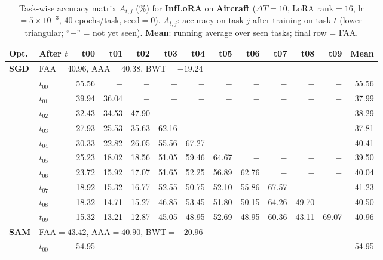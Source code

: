 \begin{table}[ht]
\centering
\caption{%
  Task-wise accuracy matrix $A_{t,j}$ (\%) for \textbf{InfLoRA} on \textbf{Aircraft} ($\Delta T=10$, LoRA rank$=16$, lr$=5\times10^{-3}$, 40 epochs/task, seed$=0$).
  $A_{t,j}$: accuracy on task $j$ after training on task $t$  (lower-triangular; ``$-$'' = not yet seen).
  \textbf{Mean}: running average over seen tasks; final row = FAA.
}
\label{tab:raw_inflora_aircraft}
\setlength{\tabcolsep}{2.8pt}
\renewcommand{\arraystretch}{0.88}
\scriptsize
\begin{tabular}{@{}l l r r r r r r r r r r r@{}}
\toprule
\textbf{Opt.} & \textbf{After $t$} & \textbf{t00} & \textbf{t01} & \textbf{t02} & \textbf{t03} & \textbf{t04} & \textbf{t05} & \textbf{t06} & \textbf{t07} & \textbf{t08} & \textbf{t09} & \textbf{Mean} \\
\midrule
\multirow{11}{*}{\textbf{SGD}} & \multicolumn{12}{l}{\quad\small FAA$=40.96$,\; AAA$=40.38$,\; BWT$=-19.24$} \\
 & $t_{00}$ & 55.56 & $-$ & $-$ & $-$ & $-$ & $-$ & $-$ & $-$ & $-$ & $-$ & 55.56 \\
 & $t_{01}$ & 39.94 & 36.04 & $-$ & $-$ & $-$ & $-$ & $-$ & $-$ & $-$ & $-$ & 37.99 \\
 & $t_{02}$ & 32.43 & 34.53 & 47.90 & $-$ & $-$ & $-$ & $-$ & $-$ & $-$ & $-$ & 38.29 \\
 & $t_{03}$ & 27.93 & 25.53 & 35.63 & 62.16 & $-$ & $-$ & $-$ & $-$ & $-$ & $-$ & 37.81 \\
 & $t_{04}$ & 30.33 & 22.82 & 26.05 & 55.56 & 67.27 & $-$ & $-$ & $-$ & $-$ & $-$ & 40.41 \\
 & $t_{05}$ & 25.23 & 18.02 & 18.56 & 51.05 & 59.46 & 64.67 & $-$ & $-$ & $-$ & $-$ & 39.50 \\
 & $t_{06}$ & 23.72 & 15.92 & 17.07 & 51.65 & 52.25 & 56.89 & 62.76 & $-$ & $-$ & $-$ & 40.04 \\
 & $t_{07}$ & 18.92 & 15.32 & 16.77 & 52.55 & 50.75 & 52.10 & 55.86 & 67.57 & $-$ & $-$ & 41.23 \\
 & $t_{08}$ & 18.32 & 14.71 & 15.27 & 46.85 & 53.45 & 51.80 & 50.15 & 64.26 & 49.70 & $-$ & 40.50 \\
 & $t_{09}$ & 15.32 & 13.21 & 12.87 & 45.05 & 48.95 & 52.69 & 48.95 & 60.36 & 43.11 & 69.07 & 40.96 \\
\midrule
\multirow{11}{*}{\textbf{SAM}} & \multicolumn{12}{l}{\quad\small FAA$=43.42$,\; AAA$=40.90$,\; BWT$=-20.96$} \\
 & $t_{00}$ & 54.95 & $-$ & $-$ & $-$ & $-$ & $-$ & $-$ & $-$ & $-$ & $-$ & 54.95 \\

\end{tabular}
\end{table}
